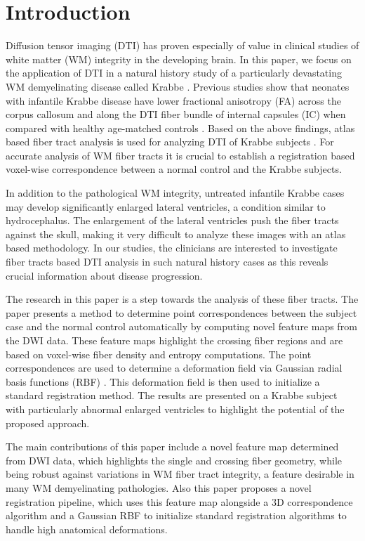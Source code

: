 \documentclass{llncs}
\begin{document}



\section{Introduction}
\label{sec:intro}
Diffusion tensor imaging (DTI) has proven especially of value in clinical studies of white matter (WM) integrity in the developing brain. In this paper, we focus on the application of DTI in a natural history study of a particularly devastating WM demyelinating disease called Krabbe \cite{Escolar09}. Previous studies show that neonates with infantile Krabbe disease have lower fractional anisotropy (FA) across the corpus callosum and along the DTI fiber bundle of internal capsules (IC) when compared with healthy age-matched controls \cite{Guo01}. Based on the above findings, atlas based fiber tract analysis is used for analyzing DTI of Krabbe subjects \cite{Goodlett06}. For accurate analysis of WM fiber tracts it is crucial to establish a registration based voxel-wise correspondence between a normal control and the Krabbe subjects. 

In addition to the pathological WM integrity, untreated infantile Krabbe cases may develop significantly enlarged lateral ventricles, a condition similar to hydrocephalus. The enlargement of the lateral ventricles push the fiber tracts against the skull, making it very difficult to analyze these images with an atlas based methodology. In our studies, the clinicians are interested to investigate fiber tracts based DTI analysis in such natural history cases as this reveals crucial information about disease progression.

The research in this paper is a step towards the analysis of these fiber tracts. The paper presents a method to determine point correspondences between the subject case and the normal control automatically by computing novel feature maps from the DWI data. These feature maps highlight the crossing fiber regions and are based on voxel-wise fiber density and entropy computations. The point correspondences are used to determine a deformation field via Gaussian radial basis functions (RBF) \cite{Mike99}. This deformation field  is then used to initialize a standard registration method. The results are presented on a Krabbe subject with particularly abnormal enlarged ventricles to highlight the potential of the proposed approach.

The main contributions of this paper include a novel feature map determined from DWI data, which highlights the single and crossing fiber geometry, while being robust against variations in WM fiber tract integrity, a feature desirable in many WM demyelinating pathologies. Also this paper proposes a novel registration pipeline, which uses this feature map alongside a 3D correspondence algorithm and a Gaussian RBF to initialize standard registration algorithms to handle high anatomical deformations.
\end{document}
